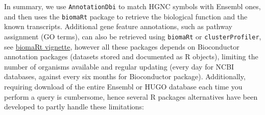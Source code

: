 \begin{Shaded}
\begin{Highlighting}[]
\OtherTok{\textless{}{-}}\SpecialCharTok{::}\NormalTok{(} \NormalTok{(}\NormalTok{, }\NormalTok{), }\NormalTok{(}\NormalTok{),}
                                  \SpecialCharTok{\%\textgreater{}\%}\SpecialCharTok{::}\SpecialCharTok{\%\textgreater{}\%}
\SpecialCharTok{::}\SpecialCharTok{\%\textgreater{}\%}
\SpecialCharTok{::}\NormalTok{(} \NormalTok{(}\NormalTok{(}\SpecialCharTok{::}\NormalTok{())}\ErrorTok{)}


\OtherTok{\textless{}{-}}\SpecialCharTok{\%\textgreater{}\%}
\SpecialCharTok{::} \NormalTok{) }\SpecialCharTok{\%\textgreater{}\%}
\SpecialCharTok{::}\NormalTok{(}
\OtherTok{\textless{}{-}}\SpecialCharTok{\%\textgreater{}\%}\SpecialCharTok{::} \NormalTok{)}
\OtherTok{\textless{}{-}}\SpecialCharTok{\%\textgreater{}\%}\SpecialCharTok{::} \NormalTok{)}
\end{Highlighting}
\end{Shaded}

In summary, we use \texttt{AnnotationDbi} to match HGNC symbols with Ensembl ones, and then uses the \texttt{biomaRt} package to retrieve the biological function and the known transcripts. Additional gene feature annotations, such as pathway assignment (GO terms), can also be retrieved using \texttt{biomaRt} or \texttt{clusterProfiler}, see \href{https://bioconductor.org/packages/release/bioc/vignettes/biomaRt/inst/doc/}{biomaRt vignette}, however all these packages depends on Bioconductor annotation packages (datasets stored and documented as R objects), limiting the number of organisms available and regular updating (every day for NCBI databases, against every six months for Bioconductor package). Additionally, requiring download of the entire Ensembl or HUGO database each time you perform a query is cumbersome, hence several R packages alternatives have been developed to partly handle these limitations:

